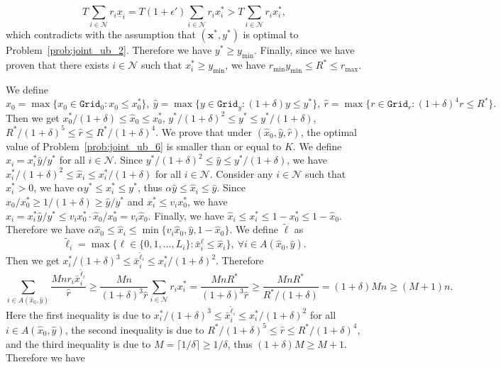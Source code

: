 \documentclass[mnsc,non-blindrev]{informs3}
\theoremstyle{definition}
\begin{document}
\begin{appendices}{\Large{}}
{\begin{equation*}
T\sum_{i\in\mathcal{N}}r_i\underline{x}_i=T(1+\epsilon')\sum_{i\in\mathcal{N}}r_ix_i^*>T\sum_{i\in\mathcal{N}}r_ix_i^*,
\end{equation*}
which contradicts with the assumption that $(\bm{x}^*,y^*)$ is optimal to Problem~\eqref{prob:joint_ub_2}. Therefore we have $y^*\geq y_{\min}$. Finally, since we have proven that there exists $i\in\mathcal{N}$ such that $x_i^*\geq y_{\min}$, we have $r_{\min}y_{\min}\leq R^*\leq r_{\max}$.

We define
\begin{equation*}
\hat{x}_0=\max\{x_0\in\texttt{Grid}_0:x_0\leq x_0^*\},\ \hat{y}=\max\{y\in\texttt{Grid}_y:(1+\delta)y\leq y^*\},\ \hat{r}=\max\{r\in\texttt{Grid}_r:(1+\delta)^4r\leq R^*\}.
\end{equation*}
Then we get $x_0^*/(1+\delta)\leq \hat{x}_0\leq x_0^*$, $y^*/(1+\delta)^2\leq y^*\leq y^*/(1+\delta)$, $R^*/(1+\delta)^5\leq \hat{r}\leq R^*/(1+\delta)^4$. We prove that under $(\hat{x}_0,\hat{y},\hat{r})$, the optimal value of Problem~\eqref{prob:joint_ub_6} is smaller than or equal to $K$. We define $\hat{x}_i=x_i^*\hat{y}/y^*$ for all $i\in\mathcal{N}$. Since $y^*/(1+\delta)^2\leq \hat{y}\leq y^*/(1+\delta)$, we have $x_i^*/(1+\delta)^2\leq\hat{x}_i\leq x_i^*/(1+\delta)$ for all $i\in\mathcal{N}$. Consider any $i\in\mathcal{N}$ such that $x_i^*>0$, we have $\alpha y^*\leq x_i^*\leq y^*$, thus $\alpha\hat{y}\leq \hat{x}_i\leq\hat{y}$. Since $\hat{x}_0/x_0^*\geq 1/(1+\delta)\geq \hat{y}/y^*$ and $x_i^*\leq v_ix_0^*$, we have $\hat{x}_i=x_i^*\hat{y}/y^*\leq v_ix_0^*\cdot \hat{x}_0/x_0^*=v_i\hat{x}_0$. Finally, we have $\hat{x}_i\leq x_i^*\leq 1-x_0^*\leq 1-\hat{x}_0$. Therefore we have $\alpha\hat{x}_0\leq\hat{x}_i\leq \min\{v_i\hat{x}_0,\hat{y},1-\hat{x}_0\}$. We define $\tilde{\bm{\ell}}$ as
\begin{equation*}
\tilde{\ell}_i=\max\{\ell\in\{0,1,\dots,L_i\}:\bar{x}_i^\ell\leq \hat{x}_i\},\ \forall i\in A(\hat{x}_0,\hat{y}).
\end{equation*}
Then we get $x_i^*/(1+\delta)^3\leq \bar{x}_i^{\tilde{\ell}_i}\leq x_i^*/(1+\delta)^2$. Therefore
\begin{equation*}
\sum_{i\in A(\hat{x}_0,\hat{y})}\dfrac{Mnr_i\bar{x}_i^{\tilde{\ell}_i}}{\hat{r}}\geq \dfrac{Mn}{(1+\delta)^3\hat{r}}\sum_{i\in\mathcal{N}}r_ix_i^*=\dfrac{MnR^*}{(1+\delta)^3\hat{r}}\geq \dfrac{MnR^*}{R^*/(1+\delta)}=(1+\delta)Mn\geq (M+1)n.
\end{equation*}
Here the first inequality is due to $x_i^*/(1+\delta)^3\leq \bar{x}_i^{\tilde{\ell}_i}\leq x_i^*/(1+\delta)^2$ for all $i\in A(\hat{x}_0,\hat{y})$, the second inequality is due to $R^*/(1+\delta)^5\leq \hat{r}\leq R^*/(1+\delta)^4$, and the third inequality is due to $M=\lceil1/\delta\rceil\geq 1/\delta$, thus $(1+\delta)M\geq M+1$. Therefore we have
}
\end{appendices}
\end{document}
